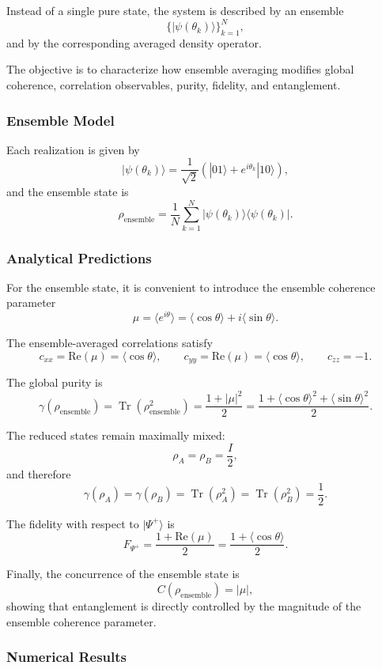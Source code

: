 \documentclass[a4paper]{article}
\begin{document}
Instead of a single pure state, the system is described by an ensemble
\[
\{ |\psi(\theta_k)\rangle \}_{k=1}^{N},
\]
and by the corresponding averaged density operator.

The objective is to characterize how ensemble averaging modifies global coherence, correlation observables, purity, fidelity, and entanglement.

\subsubsection{Ensemble Model}

Each realization is given by
\[
|\psi(\theta_k)\rangle
=
\frac{1}{\sqrt{2}}
\left(
|01\rangle + e^{i\theta_k}|10\rangle
\right),
\]
and the ensemble state is
\[
\rho_{\mathrm{ensemble}}
=
\frac{1}{N}
\sum_{k=1}^{N}
|\psi(\theta_k)\rangle\langle \psi(\theta_k)|.
\]

\subsubsection{Analytical Predictions}

For the ensemble state, it is convenient to introduce the ensemble coherence parameter
\[
\mu = \langle e^{i\theta} \rangle
=
\langle \cos\theta \rangle + i \langle \sin\theta \rangle.
\]

The ensemble-averaged correlations satisfy
\[
c_{xx} = \mathrm{Re}(\mu) = \langle \cos\theta \rangle,\qquad
c_{yy} = \mathrm{Re}(\mu) = \langle \cos\theta \rangle,\qquad
c_{zz} = -1.
\]

The global purity is
\[
\gamma(\rho_{\mathrm{ensemble}})
=
\operatorname{Tr}(\rho_{\mathrm{ensemble}}^2)
=
\frac{1 + |\mu|^2}{2}
=
\frac{1 + \langle \cos\theta \rangle^2 + \langle \sin\theta \rangle^2}{2}.
\]

The reduced states remain maximally mixed:
\[
\rho_A = \rho_B = \frac{I}{2},
\]
and therefore
\[
\gamma(\rho_A)=\gamma(\rho_B)
=
\operatorname{Tr}(\rho_A^2)=\operatorname{Tr}(\rho_B^2)=\frac{1}{2}.
\]

The fidelity with respect to \( |\Psi^+\rangle \) is
\[
F_{\Psi^+}
=
\frac{1 + \mathrm{Re}(\mu)}{2}
=
\frac{1 + \langle \cos\theta \rangle}{2}.
\]

Finally, the concurrence of the ensemble state is
\[
C(\rho_{\mathrm{ensemble}}) = |\mu|,
\]
showing that entanglement is directly controlled by the magnitude of the ensemble coherence parameter.

\subsubsection{Numerical Results}
\end{document}
